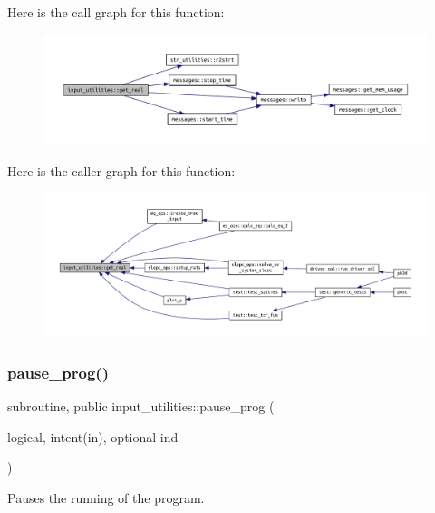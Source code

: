 Here is the call graph for this function\+:
\nopagebreak
\begin{figure}[H]
\begin{center}
\leavevmode
\includegraphics[width=350pt]{namespaceinput__utilities_a41fc0c806e12bc722771210cfa1edbd3_cgraph}
\end{center}
\end{figure}
Here is the caller graph for this function\+:
\nopagebreak
\begin{figure}[H]
\begin{center}
\leavevmode
\includegraphics[width=350pt]{namespaceinput__utilities_a41fc0c806e12bc722771210cfa1edbd3_icgraph}
\end{center}
\end{figure}
\mbox{\label{namespaceinput__utilities_a71bd36f063d55ab62c7a37864aef1185}} 
\subsubsection{\texorpdfstring{pause\+\_\+prog()}{pause\_prog()}}
{\footnotesize\ttfamily subroutine, public input\+\_\+utilities\+::pause\+\_\+prog (\begin{DoxyParamCaption}\item[{logical, intent(in), optional}]{ind }\end{DoxyParamCaption})}



Pauses the running of the program. 

